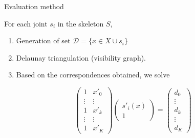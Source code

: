 \begin{frame}{Evaluation method}
  \begin{itemize}
    {
   \item For each joint $s_i$ in the skeleton $S$,
   \begin{enumerate}
    \item Generation of set $\mathcal{D} = \{ x \in X \cup s_i \}$
    \item Delaunay triangulation (visibility graph).
    \item Based on the correspondences obtained, we solve
   \end{enumerate}
    \begin{minipage}[c]{\textwidth}
      \tiny
      \begin{equation}\nonumber
	\left( \begin{array}{cc}
	  1 & x'_0 \\
	  \vdots & \vdots \\
	  1 & x'_k \\
	  \vdots & \vdots \\
	  1 & x'_K \end{array} \right)
	    \left( \begin{array}{c}
	  s'_i(x) \\
	  1 \end{array} \right) = 
	    \left( \begin{array}{cc}
	  d_0 \\
	  \vdots \\
	  d_k \\
	  \vdots \\
	  d_K \end{array} \right)
      \end{equation}
    \end{minipage}
    \begin{figure}
        \centering
        \begin{subfigure}[b]{0.3\textwidth}
                \centering

\end{subfigure}
\end{figure}}
\end{itemize}
\end{frame}
